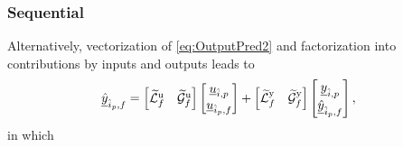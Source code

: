 \subsubsection{Sequential}\label{sec:SequentialSolMethod}
Alternatively, vectorization of \eqref{eq:OutputPred2} and factorization into contributions by inputs and outputs leads to
\begin{align}\label{eq:Sequential1}
    \underline{\hat{y}}_{\hat{i}_p,f} &=
    \begin{bmatrix}
        \widetilde{\mathcal{L}}^\mathrm{u}_f & \widetilde{\mathcal{G}}^\mathrm{u}_f 
    \end{bmatrix}    
    \begin{bmatrix}
        \underline{u}_{\hat{i},p}\\
        \underline{u}_{\hat{i}_p,f}
    \end{bmatrix}+
    \begin{bmatrix}
        \widetilde{\mathcal{L}}^\mathrm{y}_f & \widetilde{\mathcal{G}}^\mathrm{y}_f 
    \end{bmatrix}    
    \begin{bmatrix}
        \underline{y}_{\hat{i},p}\\
        \underline{\hat{y}}_{\hat{i}_p,f}
    \end{bmatrix},
\end{align}
in which
